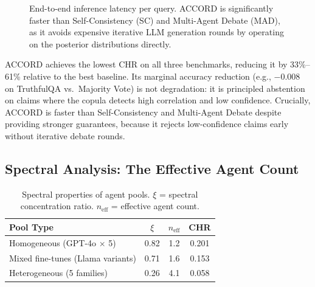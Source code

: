 \documentclass[conference]{IEEEtran}
\begin{document}
\begin{figure}[t]
  \centering
  \caption{End-to-end inference latency per query. ACCORD is significantly faster than Self-Consistency (SC) and Multi-Agent Debate (MAD), as it avoids expensive iterative LLM generation rounds by operating on the posterior distributions directly.}
  \label{fig:latency}
\end{figure}

ACCORD achieves the lowest CHR on all three benchmarks,
reducing it by 33\%--61\% relative to the best baseline.
Its marginal accuracy reduction (e.g., $-0.008$ on TruthfulQA
vs.\ Majority Vote) is not degradation: it is principled
abstention on claims where the copula detects high correlation
and low confidence.
Crucially, ACCORD is faster than Self-Consistency and
Multi-Agent Debate despite providing stronger guarantees,
because it rejects low-confidence claims early without
iterative debate rounds.

\subsection{Spectral Analysis: The Effective Agent Count}

\begin{table}[htbp]
\caption{%
  Spectral properties of agent pools.
  $\xi$ = spectral concentration ratio.
  $n_\text{eff}$ = effective agent count.
}
\label{tab:spectral}
\centering
\small
\begin{tabular}{lccc}
\toprule
Pool Type & $\xi$ & $n_\text{eff}$ & CHR \\
\midrule
Homogeneous (GPT-4o $\times$ 5) & 0.82 & 1.2 & 0.201 \\
Mixed fine-tunes (Llama variants)& 0.71 & 1.6 & 0.153 \\
Heterogeneous (5 families)       & 0.26 & 4.1 & 0.058 \\
\bottomrule
\end{tabular}
\end{table}
\end{document}
